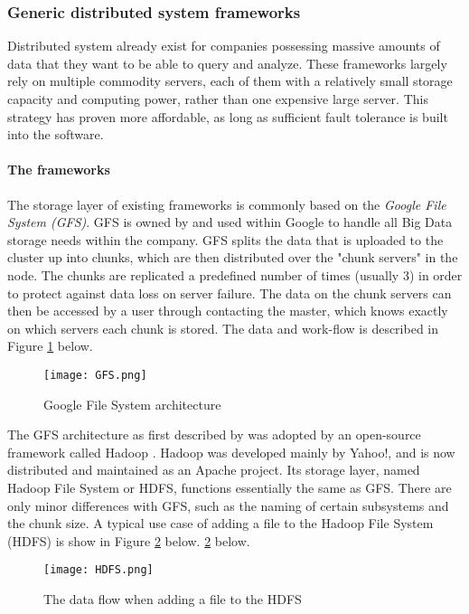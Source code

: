 \subsubsection{Generic distributed system frameworks}
Distributed system already exist for companies possessing massive amounts of data that they want to be able to query and analyze. These frameworks largely rely on multiple commodity servers, each of them with a relatively small storage capacity and computing power, rather than one expensive large server. This strategy has proven more affordable, as long as sufficient fault tolerance is built into the software.

\paragraph{The frameworks}
The storage layer of existing frameworks is commonly based on the \textit{Google File System (GFS)}\cite{Ghem03}. GFS is owned by and used within Google to handle all Big Data storage needs within the company. GFS splits the data that is uploaded to the cluster up into chunks, which are then distributed over the "chunk servers" in the node. The chunks are replicated a predefined number of times (usually 3) in order to protect against data loss on server failure. The data on the chunk servers can then be accessed by a user through contacting the master, which knows exactly on which servers each chunk is stored.\cite{Ghem03} The data and work-flow is described in Figure \ref{GFS_Architecture} below.

\begin{figure}
	\begin{center}
	\texttt{[image: GFS.png]}
	\caption{Google File System architecture}%
	\label{GFS_Architecture}
	\end{center}
\end{figure}

The GFS architecture as first described by \citep{Ghem03} was adopted by an open-source framework called Hadoop \cite{Shv10}. Hadoop was developed mainly by Yahoo!, and is now distributed and maintained as an Apache project. Its storage layer, named Hadoop File System or HDFS, functions essentially the same as GFS. There are only minor differences with GFS, such as the naming of certain subsystems and the chunk size. A typical use case of adding a file to the Hadoop File System (HDFS) is show in Figure \ref{Hadoop_usecase} below. \ref{Hadoop_usecase} below.

\begin{figure}
	\begin{center}
	\texttt{[image: HDFS.png]}
	\caption{The data flow when adding a file to the HDFS}%
	\label{Hadoop_usecase}
	\end{center}
\end{figure}

